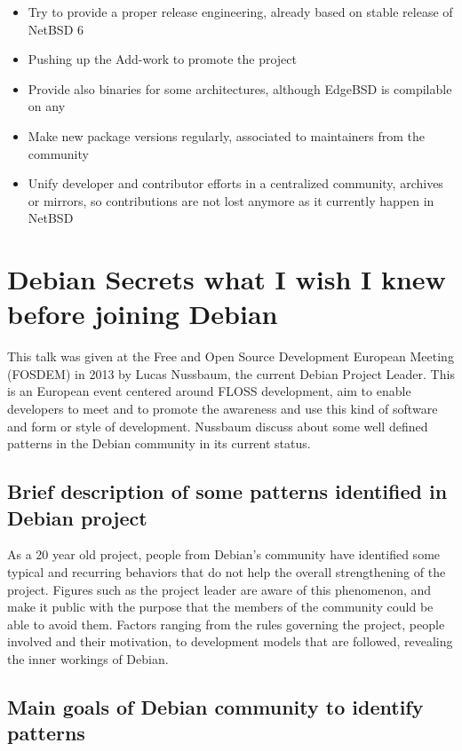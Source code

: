 \documentclass[11pt]{article} %
\begin{document}
\begin{itemize}
	\item Try to provide a proper release engineering, already based on stable release of NetBSD 6
	\item Pushing up the Add-work to promote the project
	\item Provide also binaries for some architectures, although EdgeBSD is compilable on any
	\item Make new package versions regularly, associated to maintainers from the community
	\item Unify developer and contributor efforts in a centralized community, archives or mirrors, so contributions are not lost anymore as it currently happen in NetBSD
\end{itemize}


\section{Debian Secrets what I wish I knew before joining Debian}

This talk was given at the Free and Open Source Development European Meeting (FOSDEM) in 2013 by Lucas Nussbaum, the current Debian Project Leader. This is an European event centered around FLOSS development, aim to enable developers to meet and to promote the awareness and use this kind of software and form or style of development. Nussbaum discuss about some well defined patterns in the Debian community in its current status.

\subsection{Brief description of some patterns identified in Debian project}

As a 20 year old project, people from Debian's community have identified some typical and recurring behaviors that do not help the overall strengthening of the project. Figures such as the project leader are aware of this phenomenon, and make it public with the purpose that the members of the community could be able to avoid them. Factors ranging from the rules governing the project, people involved and their motivation, to development models that are followed, revealing the inner workings of Debian.

\subsection{Main goals of Debian community to identify patterns}
\end{document}
